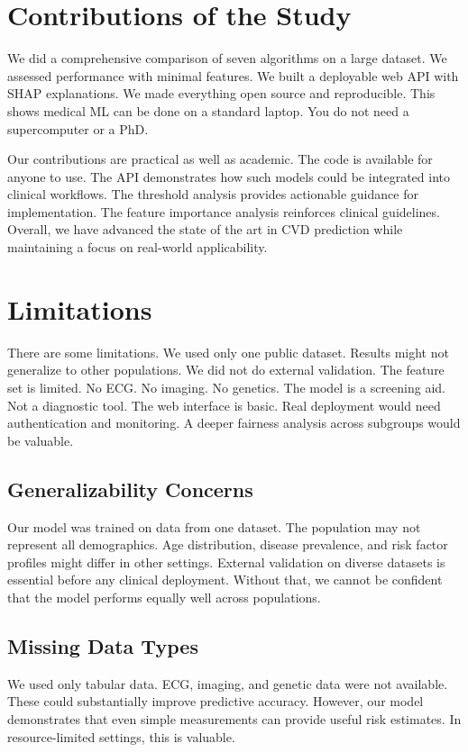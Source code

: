 \documentclass[12pt, a4paper, oneside]{book}
\begin{document}
\section{Contributions of the Study}
We did a comprehensive comparison of seven algorithms on a large dataset. We assessed performance with minimal features. We built a deployable web API with SHAP explanations. We made everything open source and reproducible. This shows medical ML can be done on a standard laptop. You do not need a supercomputer or a PhD.

Our contributions are practical as well as academic. The code is available for anyone to use. The API demonstrates how such models could be integrated into clinical workflows. The threshold analysis provides actionable guidance for implementation. The feature importance analysis reinforces clinical guidelines. Overall, we have advanced the state of the art in CVD prediction while maintaining a focus on real-world applicability.

\section{Limitations}
There are some limitations. We used only one public dataset. Results might not generalize to other populations. We did not do external validation. The feature set is limited. No ECG. No imaging. No genetics. The model is a screening aid. Not a diagnostic tool. The web interface is basic. Real deployment would need authentication and monitoring. A deeper fairness analysis across subgroups would be valuable.

\subsection{Generalizability Concerns}
Our model was trained on data from one dataset. The population may not represent all demographics. Age distribution, disease prevalence, and risk factor profiles might differ in other settings. External validation on diverse datasets is essential before any clinical deployment. Without that, we cannot be confident that the model performs equally well across populations.

\subsection{Missing Data Types}
We used only tabular data. ECG, imaging, and genetic data were not available. These could substantially improve predictive accuracy. However, our model demonstrates that even simple measurements can provide useful risk estimates. In resource-limited settings, this is valuable.
\end{document}
